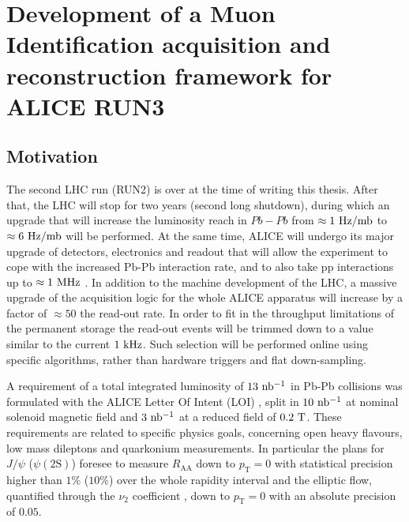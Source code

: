 \chapter{Development of a Muon Identification acquisition and reconstruction framework for ALICE RUN3}

\section{Motivation}
The second LHC run (RUN2) is over at the time of writing this thesis.
After that, the LHC will stop for two years (second long shutdown), during which an upgrade that will increase the luminosity reach in $Pb-Pb$ from $\approx 1\ \rm Hz/mb$ to $\approx6\ \rm Hz/mb$ will be performed.
At the same time, ALICE will undergo its major upgrade of detectors, electronics and readout that will allow the experiment to cope with the increased Pb-Pb interaction rate, and to also take pp interactions up to $\approx1\ \rm MHz$ \cite{Abelev:1625842, CERN-LHCC-2013-020, CERN-LHCC-2015-001, Antonioli:1603472, Buncic:2011297}.
In addition to the machine development of the LHC, a massive upgrade of the acquisition logic for the whole ALICE apparatus will increase by a factor of $\approx50$ the read-out rate.
In order to fit in the throughput limitations of the permanent storage the read-out events will be trimmed down to a value similar to the current $1\ \rm kHz$.
Such selection will be performed online using specific algorithms, rather than hardware triggers and flat down-sampling.

A requirement of a total integrated luminosity of $13\ \rm nb^{-1}$ in Pb-Pb collisions was formulated with the ALICE Letter Of Intent (LOI) \cite{ALICE_LOI}, split in $10\ \rm nb^{-1}$ at nominal solenoid magnetic field and $3\ \rm nb^{-1}$ at a reduced field of $0.2\ \rm T$.
These requirements are related to specific physics goals, concerning open heavy flavours, low mass dileptons and quarkonium measurements.
In particular the plans for $J/\psi$ ($\psi(\mathrm{2S})$) foresee to measure $R_{\mathrm{AA}}$ down to $p_{\mathrm{T}} = 0$ with statistical precision higher than $1\%$ ($10\%$) over the whole rapidity interval and the elliptic flow, quantified through the $\nu_2$ coefficient \cite{Acharya:2017tgv}, down to $p_{\mathrm{T}} = 0$ with an absolute precision of $0.05$.

